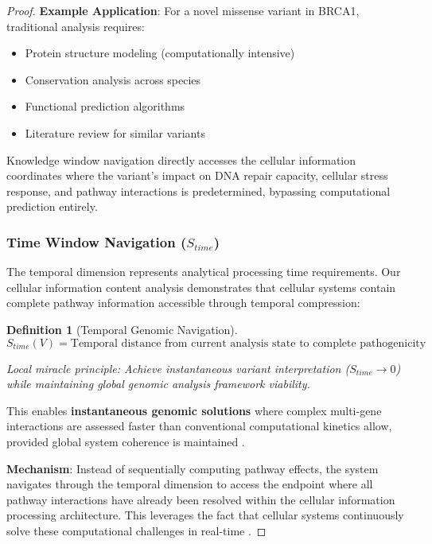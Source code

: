 \documentclass[12pt,a4paper]{article}
\newtheorem{definition}[theorem]{Definition}
\begin{document}
\begin{proof}
\textbf{Example Application}: For a novel missense variant in BRCA1, traditional analysis requires:
\begin{itemize}
\item Protein structure modeling (computationally intensive)
\item Conservation analysis across species
\item Functional prediction algorithms
\item Literature review for similar variants
\end{itemize}

Knowledge window navigation directly accesses the cellular information coordinates where the variant's impact on DNA repair capacity, cellular stress response, and pathway interactions is predetermined, bypassing computational prediction entirely.

\subsubsection{Time Window Navigation ($S_{time}$)}

The temporal dimension represents analytical processing time requirements. Our cellular information content analysis demonstrates that cellular systems contain complete pathway information accessible through temporal compression:

\begin{definition}[Temporal Genomic Navigation]
$$S_{time}(V) = \text{Temporal distance from current analysis state to complete pathogenicity assessment}$$

Local miracle principle: Achieve instantaneous variant interpretation ($S_{time} \rightarrow 0$) while maintaining global genomic analysis framework viability.
\end{definition}

This enables \textbf{instantaneous genomic solutions} where complex multi-gene interactions are assessed faster than conventional computational kinetics allow, provided global system coherence is maintained \cite{karczewski2020mutational, collins2020genomic}.

\textbf{Mechanism}: Instead of sequentially computing pathway effects, the system navigates through the temporal dimension to access the endpoint where all pathway interactions have already been resolved within the cellular information processing architecture. This leverages the fact that cellular systems continuously solve these computational challenges in real-time \cite{alberts2014molecular, cooper2018cell}.


\end{proof}
\end{document}
